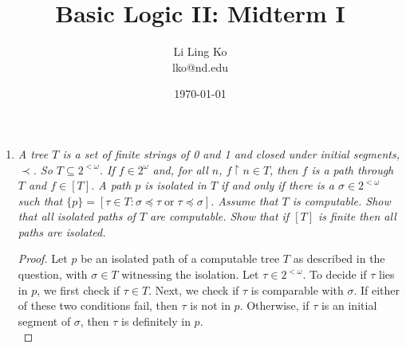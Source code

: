 \documentclass{article}
\begin{document}
\title{Basic Logic II: Midterm I}
\author{Li Ling Ko\\ lko@nd.edu}
\date{\today}
\maketitle

\begin{enumerate}[label={\bf Q\arabic*:}]
  \item \it A tree $T$ is a set of finite strings of 0 and 1 and closed
    under initial segments, $\prec$. So $T\subseteq2^{<\omega}$. If
    $f\in2^\omega$ and, for all $n$, $f\restriction n\in T$, then $f$ is a
    path through $T$ and $f\in[T]$. A path $p$ is isolated in $T$ if and
    only if there is a $\sigma\in2^{<\omega}$ such that $\{p\}=[\tau\in
    T:\sigma\preceq\tau\; \text{or}\; \tau\preceq\sigma]$. Assume that $T$
    is computable. Show that all isolated paths of $T$ are computable. Show
    that if $[T]$ is finite then all paths are isolated.

    \begin{proof}
      Let $p$ be an isolated path of a computable tree $T$ as described in
      the question, with $\sigma\in T$ witnessing the isolation. Let
      $\tau\in2^{<\omega}$. To decide if $\tau$ lies in $p$, we first check
      if $\tau\in T$. Next, we check if $\tau$ is comparable with
      $\sigma$. If either of these two conditions fail, then $\tau$ is not
      in $p$. Otherwise, if $\tau$ is an initial segment of $\sigma$, then
      $\tau$ is definitely in $p$. \\


\end{proof}
\end{enumerate}
\end{document}
